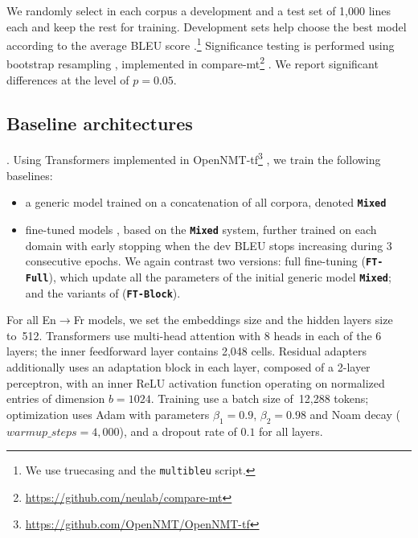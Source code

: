 \documentclass[11pt,a4paper]{article}
\newcommand{\fyTodo}[1]{\Todo[FY:]{\textcolor{orange}{#1}}}
\newcommand{\fyDone}[1]{\done[FY]\Todo[FY:]{\textcolor{orange}{#1}}}
\newcommand{\system}[1]{\texttt{\textbf{#1}}}
\begin{document}
We randomly select in each corpus a development and a test set of 1,000 lines each and keep the rest for training. Development sets help choose the best model according to the average BLEU score \cite{Papineni02bleu}.\footnote{We use truecasing and the \texttt{multibleu} script.}\fyDone{A word about meta-parameter settings} Significance testing is performed using bootstrap resampling \cite{Koehn04statistical}, implemented in compare-mt\footnote{\url{https://github.com/neulab/compare-mt}} \cite{Neubig19compare-mt}. We report significant differences at the level of $p=0.05$.\fyTodo{Is this part on significance testing still accurate ?}

\subsection{Baseline architectures \label{ssec:baseline}}
\fyTodo{Write this - settings and parameters for Mixed and Full-FT}.
Using Transformers \cite{Vaswani17attention} implemented in OpenNMT-tf\footnote{\url{https://github.com/OpenNMT/OpenNMT-tf}} \cite{Klein17opennmt}, we train the following baselines:
\begin{itemize}
\item a generic model trained on a concatenation of all corpora, denoted \system{Mixed}\fyDone{Or mixed nat ?}
\item fine-tuned models \cite{Luong15stanford,Freitag16fast}, based on the \system{Mixed} system, further trained on each domain with early stopping when the dev BLEU stops increasing during 3 consecutive epochs. We again contrast two versions: full fine-tuning (\system{FT-Full}), which update all the parameters of the initial generic model \system{Mixed}; and the variants of \cite{Bapna19simple} (\system{FT-Block}).
\end{itemize}

For all En$\rightarrow$Fr models, we set the embeddings size and the hidden layers size to~512. Transformers use multi-head attention with 8 heads in each of the 6 layers; the inner feedforward layer contains 2,048 cells. Residual adapters additionally uses an adaptation block in each layer, composed of a 2-layer perceptron, with an inner ReLU activation function operating on normalized entries of dimension $b=1024$.
Training use a batch size of~12,288 tokens; optimization uses Adam with parameters $\beta_1=0.9$, $\beta_2= 0.98$ and Noam decay ($warmup\_steps=4,000$), and a dropout rate of $0.1$ for all layers.\fyDone{Describe the block adaptation layer - voir slides}
\end{document}
